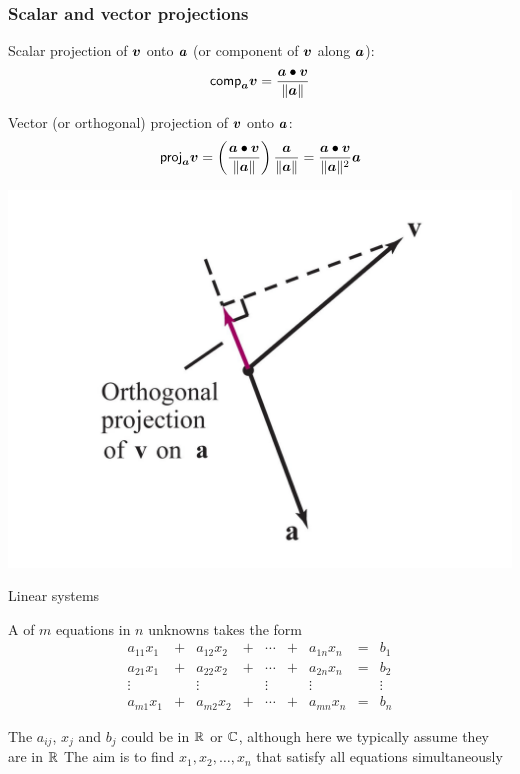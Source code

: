 \documentclass[aspectratio=169]{beamer}\usepackage[]{graphicx}\usepackage[]{xcolor}
\begin{document}
\begin{frame}
\frametitle{Scalar and vector projections}
	Scalar projection of $\bm{v}$ onto $\bm{a}$ (or component of $\bm{v}$ along $\bm{a}$):
	\[
  	\mathsf{comp}_{\bm{a}}\bm{v}=
  	\frac{\bm{a}\bullet\bm{v}}{\|\bm{a}\|}
	\]
	\begin{minipage}{0.59\textwidth}
		Vector (or orthogonal) projection of $\bm{v}$ onto $\bm{a}$:
		\[
		\mathsf{proj}_{\bm{a}}\bm{v}=
		  \left(
		    \frac{\bm{a}\bullet\bm{v}}{\|\bm{a}\|}
		  \right)
		  \frac{\bm{a}}{\|\bm{a}\|}
		  =\frac{\bm{a}\bullet\bm{v}}{\|\bm{a}\|^2}\bm{a}
		\]
	\end{minipage}
	\begin{minipage}{0.39\textwidth}
		\begin{center}
			\includegraphics[width=1.1\textwidth]{FIGS/proj_v_onto_a}
		\end{center}
	\end{minipage}
\end{frame}




\begin{frame}{Linear systems}
\begin{definition}
	A  of $m$ equations in $n$ unknowns takes the form
	\begin{equation}\label{sys:linear_system}
	\begin{matrix}
	a_{11}x_1 &+& a_{12}x_2 &+& \cdots &+& a_{1n}x_n &=& b_1 \\
	a_{21}x_1 &+& a_{22}x_2 &+& \cdots &+& a_{2n}x_n &=& b_2 \\
	\vdots && \vdots && \vdots && \vdots && \vdots \\
	a_{m1}x_1 &+& a_{m2}x_2 &+& \cdots &+& a_{mn}x_n &=& b_n
	\end{matrix}
	\end{equation}
\end{definition}
The $a_{ij}$, $x_j$ and $b_j$ could be in $\mathbb{R}$ or $\mathbb{C}$, although here we typically assume they are in $\mathbb{R}$
\vfill
The aim is to find $x_1,x_2,\ldots,x_n$ that satisfy all equations simultaneously
\end{frame}
\end{document}
